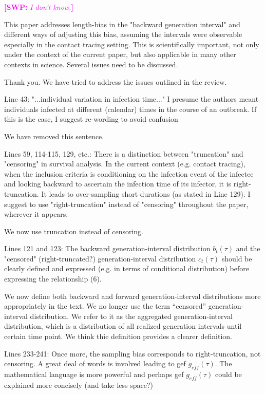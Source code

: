 \documentclass[12pt]{article}
\newcommand{\revtext}{\textsf}
\newcommand{\comment}[3]{\textcolor{#1}{\textbf{[#2: }\textsl{#3}\textbf{]}}}
\newcommand{\swp}[1]{\comment{magenta}{SWP}{#1}}
\begin{document}
\swp{I don't know.}

\revtext{This paper addresses length-bias in the "backward generation interval" and
different ways of adjusting this bias, assuming the intervals were observable
especially in the contact tracing setting. This is scientifically important, not
only under the context of the current paper, but also applicable in many other
contexts in science. Several issues need to be discussed.}

Thank you. We have tried to address the issues outlined in the review.

\revtext{
Line 43: "...individual variation in infection time..." I presume the authors
meant individuals infected at different (calendar) times in the course of
an outbreak. If this is the case, I suggest re-wording to avoid confusion
}

We have removed this sentence.

\revtext{
Lines 59, 114-115, 129, etc.: There is a distinction between "truncation"
and "censoring" in survival analysis. In the current context (e.g. contact tracing), when the inclusion criteria is conditioning on the infection
event of the infectee and looking backward to ascertain the infection time
of its infector, it is right-truncation. It leads to over-sampling short durations (as stated in Line 129). I suggest to use "right-truncation" instead
of "censoring" throughout the paper, wherever it appears.
}

We now use truncation instead of censoring.

\revtext{
Lines 121 and 123: The backward generation-interval distribution $b_t(\tau)$ and
the "censored" (right-truncated?) generation-interval distribution $c_t(\tau)$
should be clearly defined and expressed (e.g. in terms of conditional distribution) before expressing the relationship (6).
}

We now define both backward and forward generation-interval distributions more appropriately in the text.
We no longer use the term ``censored'' generation-interval distribution. 
We refer to it as the aggregated generation-interval distribution, which is a distribution of all realized generation intervals until certain time point.
We think thie definition provides a clearer definition.

\revtext{
Lines 233-241: Once more, the sampling bias corresponds to right-truncation,
not censoring. A great deal of words is involved leading to gef $g_{eff}(\tau)$. The
mathematical language is more powerful and perhaps gef $g_{eff}(\tau)$ could be
explained more concisely (and take less space?)
}
\end{document}
